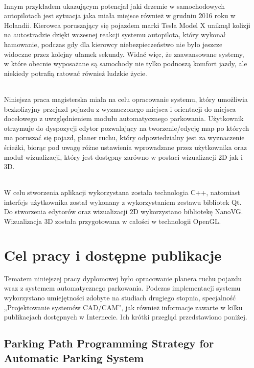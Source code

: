 \documentclass[a4paper,11pt,twoside]{report}
\theoremstyle{definition}
\begin{document}
~\\Innym przykładem ukazującym potencjał jaki drzemie w samochodowych autopilotach jest sytuacja jaka miała miejsce również w grudniu 2016 roku w Holandii. Kierowca poruszający się pojazdem marki Tesla Model X uniknął kolizji na autostradzie dzięki wczesnej reakcji systemu autopilota, który wykonał hamowanie, podczas gdy dla kierowcy niebezpieczeństwo nie było jeszcze widoczne przez kolejny ułamek sekundy. Widać więc, że zaawansowane systemy, w które obecnie wyposażane są samochody nie tylko podnoszą komfort jazdy, ale niekiedy potrafią ratować również ludzkie życie.

~\\Niniejsza praca magisterska miała na celu opracowanie systemu, który umożliwia bezkolizyjny przejazd pojazdu z wyznaczonego miejsca i orientacji do miejsca docelowego z uwzględnieniem modułu automatycznego parkowania. Użytkownik otrzymuje do dyspozycji edytor pozwalający na tworzenie/edycję map po których ma poruszać się pojazd, planer ruchu, który odpowiedzialny jest za wyznaczenie ścieżki, biorąc pod uwagę różne ustawienia wprowadzane przez użytkownika oraz moduł wizualizacji, który jest dostępny zarówno w postaci wizualizacji 2D jak i 3D. 

~\\W celu stworzenia aplikacji wykorzystana została technologia C++, natomiast interfejs użytkownika został wykonany z wykorzystaniem zestawu bibliotek Qt. Do stworzenia edytorów oraz wizualizacji 2D wykorzystano bibliotekę NanoVG. Wizualizacja 3D została przygotowana w całości w technologii OpenGL.


\chapter{Cel pracy i dostępne publikacje}

Tematem niniejszej pracy dyplomowej było opracowanie planera ruchu pojazdu wraz z systemem automatycznego parkowania. Podczas implementacji systemu wykorzystano umiejętności zdobyte na studiach drugiego stopnia, specjalność „Projektowanie systemów CAD/CAM”, jak również informacje zawarte w kilku publikacjach dostępnych w Internecie. Ich krótki przegląd przedstawiono poniżej. 

\section{Parking Path Programming Strategy for Automatic Parking System}
\end{document}
